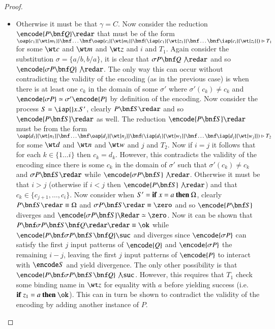 \documentclass[submission,copyright,creativecommons]{eptcs}
\renewcommand{\beq}{\simeq}
\newcommand{\ift}[3]{{\bf if}\ #1=#2\ {\bf then}\ #3}
\newcommand{\join}[1]{(#1)\rhd }
\begin{document}
\begin{proof}
\begin{itemize}
\item Otherwise it must be that $\gamma=C$. Now consider the reduction $\encode{P\bnf Q}\redar$
that must be of the form
$\oap {c_1} {\wt {m_1}} \bnf \ldots \bnf \oap {c_i} {\wt {m_i}} \bnf
\join {\iap {c_1} {\wt {z_1}}\bnf\ldots\bnf\iap {c_i} {\wt {z_i}}} T_1$
for some $\wt c$ and $\wt m$ and $\wt z$ and $i$ and $T_1$.
Again consider the substitution $\sigma=\{a/b,b/a\}$, it is clear that $\sigma P\bnf Q\not\redar$
and so $\encode{\sigma P\bnf Q}\not\redar$. The only way this can occur without contradicting
the validity of the encoding (as in the previous case) is when there is at least one $c_k$ in the
domain of some $\sigma '$ where $\sigma '(c_k)\neq c_k$ and $\encode{\sigma P}\beq \sigma'\encode{P}$
by definition of the encoding.
Now consider the process $S=\iap {} x.S'$,
clearly $P\bnf S\redar$ and so $\encode{P\bnf S}\redar$ as well.
The reduction $\encode{P\bnf S}\redar$ must be from the form
$\oap {d_1} {\wt {n_1}} \bnf \ldots \bnf \oap {d_j} {\wt {n_j}} \bnf
\join {\iap {d_1} {\wt {w_1}}\bnf\ldots\bnf\iap {d_j} {\wt {w_j}}} T_2$
for some $\wt d$ and $\wt n$ and $\wt w$ and $j$ and $T_2$.
Now if $i=j$ it follows that for each $k\in\{1\ldots i\}$ then $c_k=d_k$.
However, this contradicts the validity of the encoding since there is some $c_k$ in the domain of $\sigma '$
such that $\sigma '(c_k)\neq c_k$ and $\sigma P\bnf S\redar$ while $\encode {\sigma P\bnf S}\not\redar$.
Otherwise it must be that $i>j$ (otherwise if $i<j$ then $\encode {P\bnf S}\not\redar$)
and that $c_k\in\{c_{j+1},\ldots,c_i\}$.
Now consider when $S'=\ift x a \Omega$, 
clearly $P\bnf S\redar\equiv\Omega$ and $\sigma P\bnf S\redar\equiv \zero$ and so
$\encode{P\bnf S}$ diverges and $\encode{\sigma P\bnf S}\Redar\beq \zero$.
Now it can be shown that $P\bnf \sigma P\bnf S\bnf Q\redar\redar \equiv\ok$ while
$\encode{P\bnf \sigma P\bnf S\bnf Q}\suc$ and diverges since $\encode {\sigma P}$
can satisfy the first $j$ input patterns of $\encode{Q}$ and $\encode{\sigma P}$ the remaining
$i-j$, leaving the first $j$ input patterns of $\encode {P}$ to interact with $\encode S$
and yield divergence.
The only other possibility is that $\encode{P\bnf \sigma P\bnf S\bnf Q}\not\suc$.
However, this requires that $T_1$ check some binding name in $\wt z$ for equality with
$a$ before yielding success (i.e.~$\ift {z_1} a \ok$). This can in turn be shown
to contradict the validity of the encoding by adding another instance of $P$.
\end{itemize}
\vspace*{-0.6cm}
\end{proof}
\end{document}
